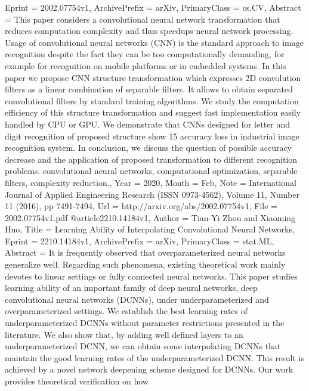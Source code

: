 {{{{Eprint        = {2002.07754v1},
ArchivePrefix = {arXiv},
PrimaryClass  = {cs.CV},
Abstract      = {This paper considers a convolutional neural network transformation that
reduces computation complexity and thus speedups neural network processing.
Usage of convolutional neural networks (CNN) is the standard approach to image
recognition despite the fact they can be too computationally demanding, for
example for recognition on mobile platforms or in embedded systems. In this
paper we propose CNN structure transformation which expresses 2D convolution
filters as a linear combination of separable filters. It allows to obtain
separated convolutional filters by standard training algorithms. We study the
computation efficiency of this structure transformation and suggest fast
implementation easily handled by CPU or GPU. We demonstrate that CNNs designed
for letter and digit recognition of proposed structure show 15%
accuracy loss in industrial image recognition system. In conclusion, we discuss
the question of possible accuracy decrease and the application of proposed
transformation to different recognition problems. convolutional neural
networks, computational optimization, separable filters, complexity reduction.},
Year          = {2020},
Month         = {Feb},
Note          = {International Journal of Applied Engineering Research (ISSN
  0973-4562), Volume 11, Number 11 (2016), pp 7491-7494},
Url           = {http://arxiv.org/abs/2002.07754v1},
File          = {2002.07754v1.pdf}
}
@article{2210.14184v1,
Author        = {Tian-Yi Zhou and Xiaoming Huo},
Title         = {Learning Ability of Interpolating Convolutional Neural Networks},
Eprint        = {2210.14184v1},
ArchivePrefix = {arXiv},
PrimaryClass  = {stat.ML},
Abstract      = {It is frequently observed that overparameterized neural networks generalize
well. Regarding such phenomena, existing theoretical work mainly devotes to
linear settings or fully connected neural networks. This paper studies learning
ability of an important family of deep neural networks, deep convolutional
neural networks (DCNNs), under underparameterized and overparameterized
settings. We establish the best learning rates of underparameterized DCNNs
without parameter restrictions presented in the literature. We also show that,
by adding well defined layers to an underparameterized DCNN, we can obtain some
interpolating DCNNs that maintain the good learning rates of the
underparameterized DCNN. This result is achieved by a novel network deepening
scheme designed for DCNNs. Our work provides theoretical verification on how
}}}}}
